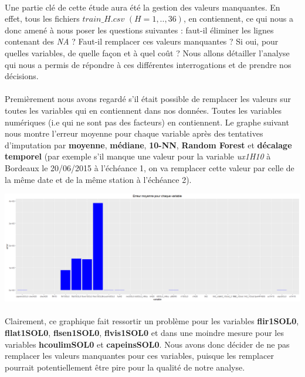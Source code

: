 \documentclass[14pt, openany]{article}
\begin{document}
\paragraph{}
Une partie clé de cette étude aura été la gestion des valeurs manquantes. En effet, tous les fichiers $train\_H.csv$ $(H=1,..,36)$, en contiennent, ce qui nous a donc amené à nous poser les questions suivantes : faut-il éliminer les lignes contenant des \textit{NA} ? Faut-il remplacer ces valeurs manquantes ? Si oui, pour quelles variables, de quelle façon et à quel coût ? Nous allons détailler l'analyse qui nous a permis de répondre à ces différentes interrogations et de prendre nos décisions.
\paragraph{}
Premièrement nous avons regardé s'il était possible de remplacer les valeurs sur toutes les variables qui en contiennent dans nos données. Toutes les variables numériques (i.e qui ne sont pas des facteurs) en contiennent. Le graphe suivant nous montre l'erreur moyenne pour chaque variable après des tentatives d'imputation par \textbf{moyenne}, \textbf{médiane}, \textbf{10-NN}, \textbf{Random Forest} et \textbf{décalage temporel} (par exemple s'il manque une valeur pour la variable \textit{ux1H10} à Bordeaux le 20/06/2015 à l'échéance 1, on va remplacer cette valeur par celle de la même date et de la même station à l'échéance 2).

\includegraphics[width=17cm]{Images/na_error.png}
\begin{center}
\label{fig1}
\end{center}
\paragraph{}
Clairement, ce graphique fait ressortir un problème pour les variables \textbf{flir1SOL0}, \textbf{fllat1SOL0}, \textbf{flsen1SOL0}, \textbf{flvis1SOL0} et dans une moindre mesure pour les variables \textbf{hcoulimSOL0} et \textbf{capeinsSOL0}. Nous avons donc décider de ne pas remplacer les valeurs manquantes pour ces variables, puisque les remplacer pourrait potentiellement être pire pour la qualité de notre analyse.
\end{document}
